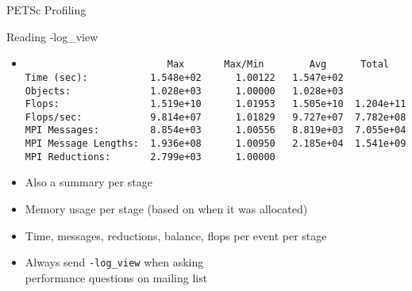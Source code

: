 \begin{frame}[fragile]{PETSc Profiling}

\begin{block}{Reading -log\_view}
\begin{itemize}
\item
{\scriptsize
\begin{verbatim}
                         Max       Max/Min        Avg      Total 
Time (sec):           1.548e+02      1.00122   1.547e+02
Objects:              1.028e+03      1.00000   1.028e+03
Flops:                1.519e+10      1.01953   1.505e+10  1.204e+11
Flops/sec:            9.814e+07      1.01829   9.727e+07  7.782e+08
MPI Messages:         8.854e+03      1.00556   8.819e+03  7.055e+04
MPI Message Lengths:  1.936e+08      1.00950   2.185e+04  1.541e+09
MPI Reductions:       2.799e+03      1.00000
\end{verbatim}}
\item Also a summary per stage
\item Memory usage per stage (based on when it was allocated)
\item Time, messages, reductions, balance, flops per event per stage
\item Always send \lstinline|-log_view| when asking \\
  performance questions on mailing list
\end{itemize}
\end{block}
\end{frame}

